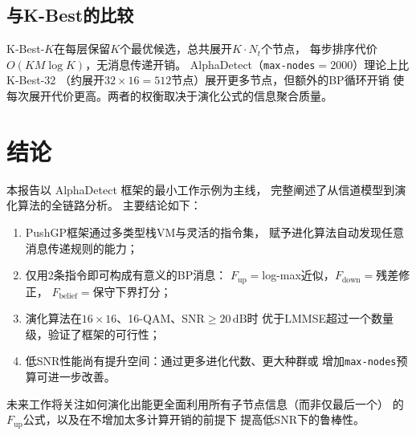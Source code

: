 \documentclass[12pt, a4paper]{ctexart}
\begin{document}
\subsection{与K-Best的比较}

K-Best-$K$在每层保留$K$个最优候选，总共展开$K\cdot N_t$个节点，
每步排序代价$O(KM\log K)$，无消息传递开销。
AlphaDetect（\texttt{max-nodes}$=2000$）理论上比K-Best-32
（约展开$32\times16=512$节点）展开更多节点，但额外的BP循环开销
使每次展开代价更高。两者的权衡取决于演化公式的信息聚合质量。


\section{结论}

本报告以 AlphaDetect 框架的最小工作示例为主线，
完整阐述了从信道模型到演化算法的全链路分析。
主要结论如下：
\begin{enumerate}[leftmargin=2em]
  \item PushGP框架通过多类型栈VM与灵活的指令集，
         赋予进化算法自动发现任意消息传递规则的能力；
  \item 仅用2条指令即可构成有意义的BP消息：
         $F_{\mathrm{up}}=$log-max近似，$F_{\mathrm{down}}=$残差修正，
         $F_{\mathrm{belief}}=$保守下界打分；
  \item 演化算法在$16\times16$、16-QAM、SNR$\geq20\,\mathrm{dB}$时
         优于LMMSE超过一个数量级，验证了框架的可行性；
  \item 低SNR性能尚有提升空间：通过更多进化代数、更大种群或
         增加\texttt{max-nodes}预算可进一步改善。
\end{enumerate}

未来工作将关注如何演化出能更全面利用所有子节点信息（而非仅最后一个）
的$F_{\mathrm{up}}$公式，以及在不增加太多计算开销的前提下
提高低SNR下的鲁棒性。
\end{document}

